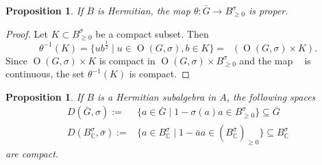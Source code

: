 \documentclass[a4paper,oneside,11pt]{amsart}
\DeclareMathOperator{\OO}{O}
\DeclareMathOperator{\bpol}{\overline{pol}}
\theoremstyle{plain}
\newtheorem{prop}[teo]{Proposition}
\theoremstyle{definition}
\theoremstyle{remark}
\begin{document}
\begin{prop}
If $B$ is Hermitian, the map $\theta\colon \bar G\to B^{\sigma}_{\geq 0}$ is proper.
\end{prop}

\begin{proof}
Let $K\subset B^{\sigma}_{\geq 0}$ be a compact subset. Then
$$\theta^{-1}(K)=\{ub^{\frac{1}{2}}\mid u\in \OO(G,\sigma), b\in K\}=
\bpol(\OO(G,\sigma)\times K).$$
Since $\OO(G,\sigma)\times K$ is compact in $\OO(G,\sigma)\times B^{\sigma}_{\geq 0}$ and the map $\bpol$ is continuous, the set $\theta^{-1}(K)$ is compact.
\end{proof}

\begin{prop}\label{comp_disc}
If $B$ is a Hermitian subalgebra in $A$, the following spaces
    \begin{align*}
        D(\bar G,\sigma):=& \{a\in \bar G\mid 1-\sigma(a)a\in B^{\sigma}_{\geq 0}\}\subseteq \bar G\\
        D(B_\mathbb C^\sigma,\bar\sigma):=& \{a\in  B^{\sigma}_\mathbb C\mid 1-\bar aa\in (B_\mathbb C^{\bar\sigma})_{\geq 0}\}\subseteq B_\mathbb C^\sigma
    \end{align*}
    are compact.
\end{prop}
\end{document}
